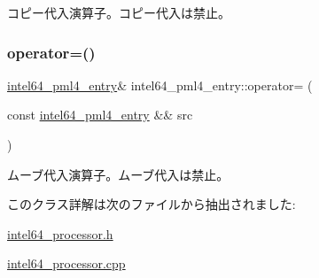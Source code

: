 コピー代入演算子。コピー代入は禁止。 \hypertarget{classintel64__pml4__entry_a92ee32ab153d91b61321ec40ca243f9f}{}\label{classintel64__pml4__entry_a92ee32ab153d91b61321ec40ca243f9f} 
\subsubsection{\texorpdfstring{operator=()}{operator=()}\hspace{0.1cm}{\footnotesize\ttfamily [2/2]}}
{\footnotesize\ttfamily \hyperlink{classintel64__pml4__entry}{intel64\+\_\+pml4\+\_\+entry}\& intel64\+\_\+pml4\+\_\+entry\+::operator= (\begin{DoxyParamCaption}\item[{const \hyperlink{classintel64__pml4__entry}{intel64\+\_\+pml4\+\_\+entry} \&\&}]{src }\end{DoxyParamCaption})\hspace{0.3cm}{\ttfamily [delete]}}

ムーブ代入演算子。ムーブ代入は禁止。 

このクラス詳解は次のファイルから抽出されました\+:\begin{DoxyCompactItemize}
\item 
\hyperlink{intel64__processor_8h}{intel64\+\_\+processor.\+h}\item 
\hyperlink{intel64__processor_8cpp}{intel64\+\_\+processor.\+cpp}\end{DoxyCompactItemize}

